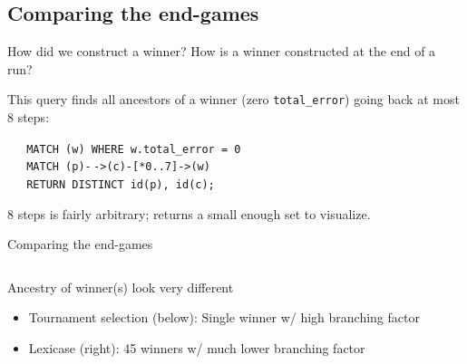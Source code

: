 \documentclass{beamer}
\newcommand{\linespace}{\vskip 0.25cm}
\begin{document}
\subsection{Comparing the end-games}

\begin{frame}{How did we construct a winner?}
	How is a winner constructed at the end of a run?
	
	\linespace
	
	This query finds all ancestors of a winner (zero \texttt{total\_error}) going back at most 8 steps:
	
	\linespace
	
	\texttt{$\quad$ MATCH (w) WHERE w.total\_error = 0 \\ %
		$\quad$ MATCH (p)-$\,$->(c)-[*0..7]->(w) \\
$\quad$ RETURN DISTINCT id(p), id(c);}

	\linespace
	
	8 steps is fairly arbitrary; returns a small enough set to visualize.
\end{frame}

\begin{frame}{Comparing the end-games}
	\begin{columns}
		\begin{column}{0.5 \linewidth}
			Ancestry of winner(s) look very different
			\begin{itemize}
				\item Tournament selection (below): Single winner w/ high branching factor
				\item Lexicase (right): 45 winners w/ much lower branching factor
			\end{itemize}
			\begin{center}
			\end{center}
		\end{column}
		\begin{column}{0.5 \linewidth}
			\begin{center}
			\end{center}
		\end{column}
	\end{columns}
\end{frame}
\end{document}

